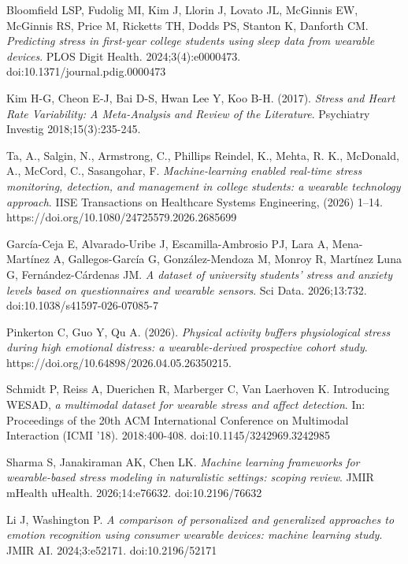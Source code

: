 \documentclass[11pt, a4paper, oneside]{article}
\begin{document}

\begin{thebibliography}{}
Bloomfield LSP, Fudolig MI, Kim J, Llorin J, Lovato JL, McGinnis EW, McGinnis RS, Price M, Ricketts TH, Dodds PS, Stanton K, Danforth CM. \textit{Predicting stress in first-year college students using sleep data from wearable devices}. PLOS Digit Health. 2024;3(4):e0000473. doi:10.1371/journal.pdig.0000473

Kim H-G, Cheon E-J, Bai D-S, Hwan Lee Y, Koo B-H.  (2017). \textit{Stress and Heart Rate Variability: A Meta-Analysis and Review of the Literature}. Psychiatry Investig 2018;15(3):235-245.

Ta, A., Salgin, N., Armstrong, C., Phillips Reindel, K., Mehta, R. K., McDonald, A., McCord, C., Sasangohar, F. \textit{Machine-learning enabled real-time stress monitoring, detection, and management in college students: a wearable technology approach}. IISE Transactions on Healthcare Systems Engineering, (2026) 1–14. https://doi.org/10.1080/24725579.2026.2685699

García-Ceja E, Alvarado-Uribe J, Escamilla-Ambrosio PJ, Lara A, Mena-Martínez A, Gallegos-García G, González-Mendoza M, Monroy R, Martínez Luna G, Fernández-Cárdenas JM. \textit{A dataset of university students' stress and anxiety levels based on questionnaires and wearable sensors}. Sci Data. 2026;13:732. doi:10.1038/s41597-026-07085-7

Pinkerton C, Guo Y, Qu A.  (2026). \textit{Physical activity buffers physiological stress during high emotional distress: a wearable-derived prospective cohort study}. https://doi.org/10.64898/2026.04.05.26350215.

Schmidt P, Reiss A, Duerichen R, Marberger C, Van Laerhoven K. Introducing WESAD, \textit{a multimodal dataset for wearable stress and affect detection}. In: Proceedings of the 20th ACM International Conference on Multimodal Interaction (ICMI '18). 2018:400-408. doi:10.1145/3242969.3242985

Sharma S, Janakiraman AK, Chen LK. \textit{Machine learning frameworks for wearable-based stress modeling in naturalistic settings: scoping review}. JMIR mHealth uHealth. 2026;14:e76632. doi:10.2196/76632

Li J, Washington P. \textit{A comparison of personalized and generalized approaches to emotion recognition using consumer wearable devices: machine learning study}. JMIR AI. 2024;3:e52171. doi:10.2196/52171


\end{thebibliography}
\end{document}

